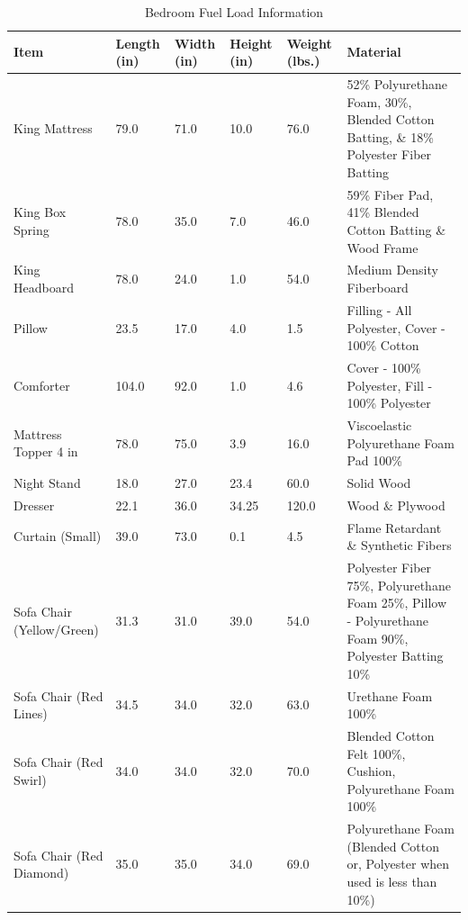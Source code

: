 \begin{table}[H]
\centering
\begin{tabular}{|L{0.23\textwidth}|C{0.08\textwidth}|C{0.08\textwidth}|C{0.08\textwidth}|C{0.08\textwidth}|L{0.25\textwidth}|}
\hline
Item 								&Length (in) 	&Width (in) 	&Height (in) 	&Weight (lbs.) 	&Material \\ \hline \hline
King Mattress 						&79.0 			&71.0 			&10.0 			&76.0 			&52\% Polyurethane Foam, 30\%, Blended Cotton Batting, \& 18\% Polyester Fiber Batting \\ \hline
King Box Spring 					&78.0 			&35.0 			&7.0			&46.0 			&59\% Fiber Pad, 41\% Blended Cotton Batting \& Wood Frame \\ \hline
King Headboard 						&78.0			&24.0 			&1.0			&54.0 			&Medium Density Fiberboard \\ \hline
Pillow 								&23.5 			&17.0 			&4.0			&1.5 			&Filling - All Polyester, Cover - 100\% Cotton \\ \hline
Comforter 							&104.0 			&92.0 			&1.0			&4.6 			&Cover - 100\% Polyester, Fill - 100\% Polyester \\ \hline
Mattress Topper 4 in 				&78.0 			&75.0 			&3.9 			&16.0  			&Viscoelastic Polyurethane Foam Pad 100\% \\ \hline
Night Stand 						&18.0 			&27.0 			&23.4	 		&60.0 			&Solid Wood \\ \hline
Dresser 							&22.1	 		&36.0 			&34.25 			&120.0 			&Wood \& Plywood \\ \hline
Curtain (Small) 					&39.0 			&73.0 			&0.1 			&4.5 			&Flame Retardant \& Synthetic Fibers \\ \hline
Sofa Chair (Yellow/Green) 			&31.3 			&31.0 			&39.0 			&54.0 			&Polyester Fiber 75\%, Polyurethane Foam 25\%, Pillow - Polyurethane Foam 90\%, Polyester Batting 10\% \\ \hline
Sofa Chair (Red Lines) 				&34.5 			&34.0 			&32.0 			&63.0 			&Urethane Foam 100\% \\ \hline
Sofa Chair (Red Swirl) 				&34.0 			&34.0 			&32.0 			&70.0 			&Blended Cotton Felt 100\%, Cushion, Polyurethane Foam 100\% \\ \hline
Sofa Chair (Red Diamond) 			&35.0 			&35.0 			&34.0 			&69.0 			&Polyurethane Foam (Blended Cotton or, Polyester when used is less than 10\%) \\ \hline
\end{tabular}
\caption{Bedroom Fuel Load Information}
\label{table:bd_fuel_weights}
\end{table}

